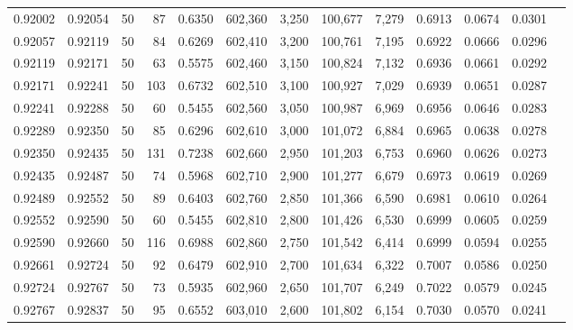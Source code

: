 \begin{tabular}{rrrrrrrrrrrrr}
0.92002 & 0.92054 &    50 &  87 &                                     0.6350 & 602,360 &   3,250 & 100,677 &   7,279 & 0.6913 & 0.0674 & 0.0301 \\
0.92057 & 0.92119 &    50 &  84 &                                     0.6269 & 602,410 &   3,200 & 100,761 &   7,195 & 0.6922 & 0.0666 & 0.0296 \\
0.92119 & 0.92171 &    50 &  63 &                                     0.5575 & 602,460 &   3,150 & 100,824 &   7,132 & 0.6936 & 0.0661 & 0.0292 \\
0.92171 & 0.92241 &    50 & 103 &                                     0.6732 & 602,510 &   3,100 & 100,927 &   7,029 & 0.6939 & 0.0651 & 0.0287 \\
0.92241 & 0.92288 &    50 &  60 &                                     0.5455 & 602,560 &   3,050 & 100,987 &   6,969 & 0.6956 & 0.0646 & 0.0283 \\
0.92289 & 0.92350 &    50 &  85 &                                     0.6296 & 602,610 &   3,000 & 101,072 &   6,884 & 0.6965 & 0.0638 & 0.0278 \\
0.92350 & 0.92435 &    50 & 131 &                                     0.7238 & 602,660 &   2,950 & 101,203 &   6,753 & 0.6960 & 0.0626 & 0.0273 \\
0.92435 & 0.92487 &    50 &  74 &                                     0.5968 & 602,710 &   2,900 & 101,277 &   6,679 & 0.6973 & 0.0619 & 0.0269 \\
0.92489 & 0.92552 &    50 &  89 &                                     0.6403 & 602,760 &   2,850 & 101,366 &   6,590 & 0.6981 & 0.0610 & 0.0264 \\
0.92552 & 0.92590 &    50 &  60 &                                     0.5455 & 602,810 &   2,800 & 101,426 &   6,530 & 0.6999 & 0.0605 & 0.0259 \\
0.92590 & 0.92660 &    50 & 116 &                                     0.6988 & 602,860 &   2,750 & 101,542 &   6,414 & 0.6999 & 0.0594 & 0.0255 \\
0.92661 & 0.92724 &    50 &  92 &                                     0.6479 & 602,910 &   2,700 & 101,634 &   6,322 & 0.7007 & 0.0586 & 0.0250 \\
0.92724 & 0.92767 &    50 &  73 &                                     0.5935 & 602,960 &   2,650 & 101,707 &   6,249 & 0.7022 & 0.0579 & 0.0245 \\
0.92767 & 0.92837 &    50 &  95 &                                     0.6552 & 603,010 &   2,600 & 101,802 &   6,154 & 0.7030 & 0.0570 & 0.0241 \\

\end{tabular}
